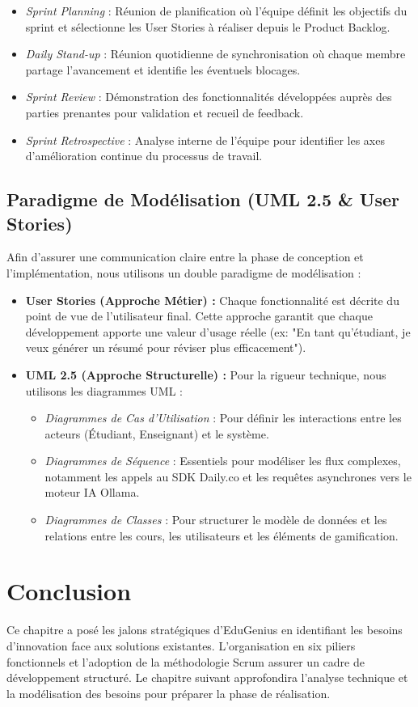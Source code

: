 \begin{itemize}
    \item \textit{Sprint Planning} : Réunion de planification où l'équipe définit les objectifs du sprint et sélectionne les User Stories à réaliser depuis le Product Backlog.
    \item \textit{Daily Stand-up} : Réunion quotidienne de synchronisation où chaque membre partage l'avancement et identifie les éventuels blocages.
    \item \textit{Sprint Review} : Démonstration des fonctionnalités développées auprès des parties prenantes pour validation et recueil de feedback.
    \item \textit{Sprint Retrospective} : Analyse interne de l'équipe pour identifier les axes d'amélioration continue du processus de travail.
\end{itemize}

\subsection{Paradigme de Modélisation (UML 2.5 \& User Stories)}

Afin d'assurer une communication claire entre la phase de conception et l'implémentation, nous utilisons un double paradigme de modélisation :

\begin{itemize}
\item \textbf{User Stories (Approche Métier) :} Chaque fonctionnalité est décrite du point de vue de l'utilisateur final. Cette approche garantit que chaque développement apporte une valeur d'usage réelle (ex: "En tant qu'étudiant, je veux générer un résumé pour réviser plus efficacement").
\item \textbf{UML 2.5 (Approche Structurelle) :} Pour la rigueur technique, nous utilisons les diagrammes UML :
\begin{itemize}
\item \textit{Diagrammes de Cas d'Utilisation} : Pour définir les interactions entre les acteurs (Étudiant, Enseignant) et le système.
\item \textit{Diagrammes de Séquence} : Essentiels pour modéliser les flux complexes, notamment les appels au SDK Daily.co et les requêtes asynchrones vers le moteur IA Ollama.
\item \textit{Diagrammes de Classes} : Pour structurer le modèle de données et les relations entre les cours, les utilisateurs et les éléments de gamification.
\end{itemize}
\end{itemize}


\section*{Conclusion}

Ce chapitre a posé les jalons stratégiques d'EduGenius en identifiant les besoins d'innovation face aux solutions existantes. L'organisation en six piliers fonctionnels et l'adoption de la méthodologie Scrum assurer un cadre de développement structuré. Le chapitre suivant approfondira l'analyse technique et la modélisation des besoins pour préparer la phase de réalisation.
